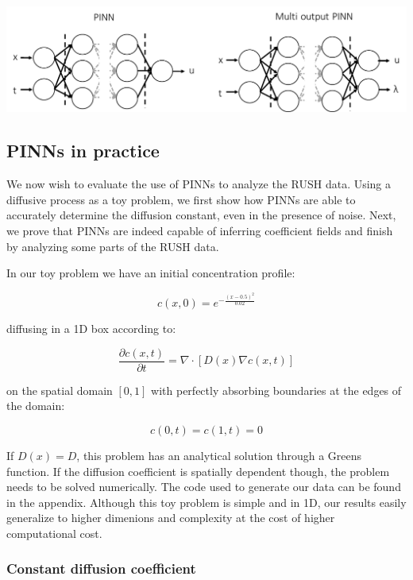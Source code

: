 \documentclass[12pt,a4paper,]{Dissertate}
\let\origfigure\figure
\let\endorigfigure\endfigure
\renewenvironment{figure}[1][2] {
    \expandafter\origfigure\expandafter[H]
} {
    \endorigfigure
}
\begin{document}
\begin{figure}
\hypertarget{fig:PINN}{%
\centering
\includegraphics{source/figures/pdf/PINN.pdf}
\caption{Left panel: a normal single output PINN. Right panel: a
multi-output PINN. The network now also predicts the coefficients values
at each data point.}\label{fig:PINN}
}
\end{figure}

\hypertarget{pinns-in-practice}{%
\subsection{PINNs in practice}\label{pinns-in-practice}}

We now wish to evaluate the use of PINNs to analyze the RUSH data. Using
a diffusive process as a toy problem, we first show how PINNs are able
to accurately determine the diffusion constant, even in the presence of
noise. Next, we prove that PINNs are indeed capable of inferring
coefficient fields and finish by analyzing some parts of the RUSH data.

In our toy problem we have an initial concentration profile:

\[
c(x, 0) = e^{-\frac{(x-0.5)^2}{0.02}}
\]

diffusing in a 1D box according to:

\[
\frac{\partial c(x,t)}{\partial t} = \nabla \cdot[D(x)\nabla c(x,t)]
\]

on the spatial domain \([0,1]\) with perfectly absorbing boundaries at
the edges of the domain:

\[
c(0,t) = c(1,t) = 0
\]

If \(D(x) = D\), this problem has an analytical solution through a
Greens function. If the diffusion coefficient is spatially dependent
though, the problem needs to be solved numerically. The code used to
generate our data can be found in the appendix. Although this toy
problem is simple and in 1D, our results easily generalize to higher
dimenions and complexity at the cost of higher computational cost.

\hypertarget{constant-diffusion-coefficient}{%
\subsubsection{Constant diffusion
coefficient}\label{constant-diffusion-coefficient}}
\end{document}
